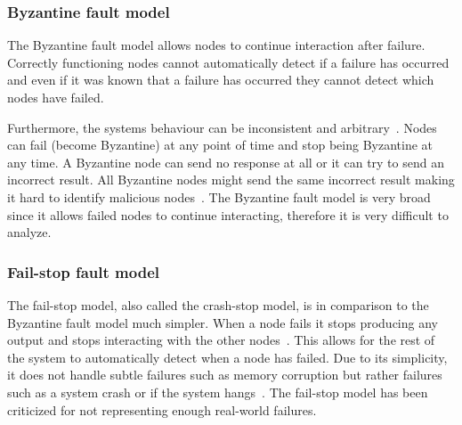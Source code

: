 \documentclass{cslthse-msc}
\begin{document}
\subsubsection{Byzantine fault model} \label{subsub:background_byzantine}
The Byzantine fault model allows nodes to continue interaction after failure. Correctly functioning nodes cannot automatically detect if a failure has occurred and even if it was known that a failure has occurred they cannot detect which nodes have failed. 

Furthermore, the systems behaviour can be inconsistent and arbitrary~\cite{surveyFaultParallel}. Nodes can fail (become Byzantine) at any point of time and stop being Byzantine at any time. A Byzantine node can send no response at all or it can try to send an incorrect result. All Byzantine nodes might send the same incorrect result making it hard to identify malicious nodes~\cite{selfAdaptRel}. %
The Byzantine fault model is very broad since it allows failed nodes to continue interacting, therefore it is very difficult to analyze.


\subsubsection{Fail-stop fault model} \label{subsub:background_fail_stop}
The fail-stop model, also called the crash-stop model, is in comparison to the Byzantine fault model much simpler. When a node fails it stops producing any output and stops interacting with the other nodes~\cite{faultTolerantFundamentals}. This allows for the rest of the system to automatically detect when a node has failed. Due to its simplicity, it does not handle subtle failures such as memory corruption but rather failures such as a system crash or if the system hangs~\cite{surveyFaultParallel}. The fail-stop model has been criticized for not representing enough real-world failures.

\end{document}
